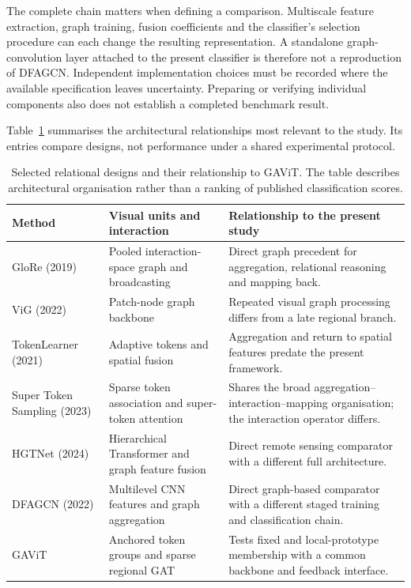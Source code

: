 The complete chain matters when defining a comparison. Multiscale feature
extraction, graph training, fusion coefficients and the classifier's
selection procedure can each change the resulting representation. A
standalone graph-convolution layer attached to the present classifier is
therefore not a reproduction of DFAGCN. Independent implementation choices
must be recorded where the available specification leaves uncertainty.
Preparing or verifying individual components also does not establish a
completed benchmark result.

Table~\ref{tab:relational-designs} summarises the architectural relationships
most relevant to the study. Its entries compare designs, not performance
under a shared experimental protocol.

\begin{table}[tbp]
 \centering
 \caption{Selected relational designs and their relationship to GAViT.
 The table describes architectural organisation rather than a ranking of
 published classification scores.}
 \label{tab:relational-designs}
 \small
 \setlength{\tabcolsep}{4pt}
 \begin{tabular}{p{2.3cm}p{4.0cm}p{6.6cm}}
  \toprule
  Method & Visual units and interaction & Relationship to the present study\\
  \midrule
  GloRe (2019) & Pooled interaction-space graph and broadcasting & Direct graph precedent for aggregation, relational reasoning and mapping back.\\[0.4em]
  ViG (2022) & Patch-node graph backbone & Repeated visual graph processing differs from a late regional branch.\\[0.4em]
  TokenLearner (2021) & Adaptive tokens and spatial fusion & Aggregation and return to spatial features predate the present framework.\\[0.4em]
  Super Token Sampling (2023) & Sparse token association and super-token attention & Shares the broad aggregation--interaction--mapping organisation; the interaction operator differs.\\[0.4em]
  HGTNet (2024) & Hierarchical Transformer and graph feature fusion & Direct remote sensing comparator with a different full architecture.\\[0.4em]
  DFAGCN (2022) & Multilevel CNN features and graph aggregation & Direct graph-based comparator with a different staged training and classification chain.\\[0.4em]
  GAViT & Anchored token groups and sparse regional GAT & Tests fixed and local-prototype membership with a common backbone and feedback interface.\\
  \bottomrule
 \end{tabular}
\end{table}

